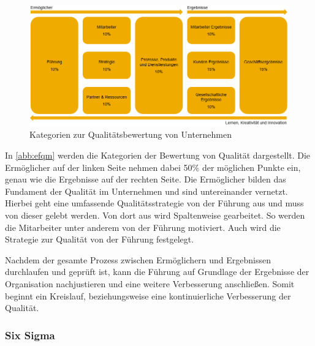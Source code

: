             \begin{figure}[!htbp]
                \begin{center}
                    \includegraphics[width=\textwidth]{Abbildungen/efqmkat}
                    \caption[Kategorien zur Qualitätsbewertung von Unternehmen]{Kategorien zur Qualitätsbewertung von Unternehmen\protect\footnotemark}
                    \label{abb:efqm}
                \end{center}
            \end{figure}


            In \autoref{abb:efqm} werden die Kategorien der Bewertung von Qualität dargestellt. Die Ermöglicher auf der linken Seite nehmen dabei 50\% der möglichen Punkte ein, genau wie die Ergebnisse auf der rechten Seite. Die Ermöglicher bilden das Fundament der Qualität im Unternehmen und sind untereinander vernetzt. Hierbei geht eine umfassende Qualitätsstrategie von der Führung aus und muss von dieser gelebt werden. Von dort aus wird Spaltenweise gearbeitet. So werden die Mitarbeiter unter anderem von der Führung motiviert. Auch wird die Strategie zur Qualität von der Führung festgelegt.

            Nachdem der gesamte Prozess zwischen Ermöglichern und Ergebnissen durchlaufen und geprüft ist, kann die Führung auf Grundlage der Ergebnisse der Organisation nachjustieren und eine weitere Verbesserung anschließen. Somit beginnt ein Kreislauf, beziehungsweise eine kontinuierliche Verbesserung der Qualität.

            \subsubsection{Six Sigma}
            \label{subsec:sixsigma}

